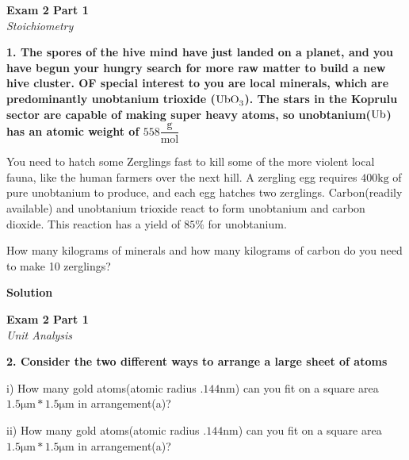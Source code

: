 \documentclass{article}
\begin{document}


    \begin{center}
        \textbf{Exam 2 Part 1}\\
        \textit{Stoichiometry}
    \end{center}
    \textbf{1. The spores of the hive mind have just landed on a planet, and you have begun your hungry search for more raw matter to build a new hive cluster. OF special interest to you are local minerals, which are predominantly unobtanium trioxide ($\ce{UbO_{3}}$). The stars in the Koprulu sector are capable of making super heavy atoms, so unobtanium($\ce{Ub}$) has an atomic weight of $558 \dfrac{\si{\gram}}{\si{\mol}}$}

    You need to hatch some Zerglings fast to kill some of the more violent local fauna, like the human farmers over the next hill. A zergling egg requires $400 \si{\kilo\gram}$ of pure unobtanium to produce, and each egg hatches two zerglings. Carbon(readily available) and unobtanium trioxide react to form unobtanium and carbon dioxide. This reaction has a yield of $85\%$ for unobtanium.

    How many kilograms of minerals and how many kilograms of carbon do you need to make 10 zerglings?

    \textbf{Solution}
    $$ $$


    \pagebreak

    \begin{center}
        \textbf{Exam 2 Part 1}\\
        \textit{Unit Analysis}
    \end{center}
    \textbf{2. Consider the two different ways to arrange a large sheet of atoms}

    i) How many gold atoms(atomic radius $.144 \si{\nano\metre}$) can you fit on a square area $1.5 \si{\micro\metre} * 1.5 \si{\micro\metre}$ in arrangement(a)?

    ii) How many gold atoms(atomic radius $.144 \si{\nano\metre}$) can you fit on a square area $1.5 \si{\micro\metre} * 1.5 \si{\micro\metre}$ in arrangement(a)?
\end{document}
